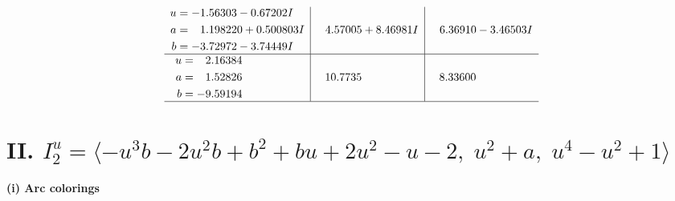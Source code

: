 \documentclass[1p]{elsarticle_modified}
\theoremstyle{definition}
\begin{document}
$$\begin{array}{c|c|c}
\begin{aligned}
u &= -1.56303 - 0.67202 I \\
a &= \phantom{-}1.198220 + 0.500803 I \\
b &= -3.72972 - 3.74449 I\end{aligned}
 & \phantom{-}4.57005 + 8.46981 I & \phantom{-}6.36910 - 3.46503 I \\ \hline\begin{aligned}
u &= \phantom{-}2.16384\phantom{ +0.000000I} \\
a &= \phantom{-}1.52826\phantom{ +0.000000I} \\
b &= -9.59194\phantom{ +0.000000I}\end{aligned}
 & \phantom{-}10.7735\phantom{ +0.000000I} & \phantom{-}8.33600\phantom{ +0.000000I}\\
 \hline 
 \end{array}$$\newpage\newpage\renewcommand{\arraystretch}{1}
\centering \section*{II. $I^u_{2}= \langle - u^3 b-2 u^2 b+b^2+b u+2 u^2- u-2,\;u^2+a,\;u^4- u^2+1 \rangle$}
\flushleft \textbf{(i) Arc colorings}\\
\end{document}
